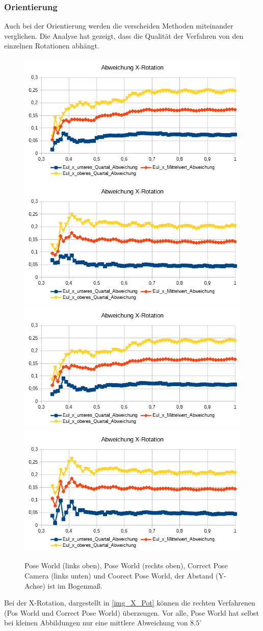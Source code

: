 \subsubsection{Orientierung}
Auch bei der Orientierung werden die verscheiden Methoden miteinander verglichen. Die Analyse hat gezeigt, dass die Qualität der Verfahren von den einzelnen Rotationen abhängt.\\
\begin{figure}
	\centering
	\includegraphics[width=0.45\linewidth]{tabelle/X_Rot_PC}
	\includegraphics[width=0.45\linewidth]{tabelle/X_Rot_PW}
	\includegraphics[width=0.45\linewidth]{tabelle/X_Rot_CPC}
	\includegraphics[width=0.45\linewidth]{tabelle/X_Rot_CPW}
	\caption{Pose World (links oben), Pose World (rechts oben), Correct Pose Camera (links unten) und Coorect Pose World, der Abstand (Y-Achse) ist im Bogenmaß.}
	\label{img_X_Pot}
\end{figure}
Bei der X-Rotation, dargestellt in \autoref{img_X_Pot} können die rechten Verfahrenen (Pos World und Correct Pose World) überzeugen. Vor alle, Pose World hat selbst bei kleinen Abbildungen nur eine mittlere Abweichung von $8.5^\circ$\\
